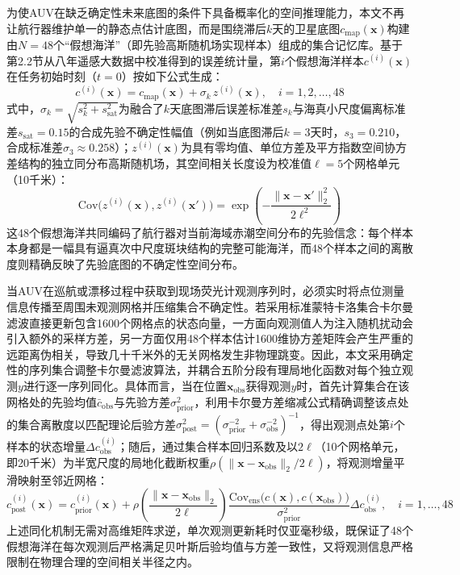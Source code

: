 为使AUV在缺乏确定性未来底图的条件下具备概率化的空间推理能力，本文不再让航行器维护单一的静态点估计底图，而是围绕滞后$k$天的卫星底图$c_{\text{map}}(\mathbf{x})$构建由$N=48$个“假想海洋”（即先验高斯随机场实现样本）组成的集合记忆库。基于第2.2节从八年遥感大数据中校准得到的误差统计量，第$i$个假想海洋样本$c^{(i)}(\mathbf{x})$在任务初始时刻（$t=0$）按如下公式生成：
\begin{equation}
  c^{(i)}(\mathbf{x}) = c_{\text{map}}(\mathbf{x}) + \sigma_k\, z^{(i)}(\mathbf{x}), \quad i = 1, 2, \dots, 48
  \label{eq:prior}
\end{equation}
式中，$\sigma_k = \sqrt{s_k^2 + s_{\text{sat}}^2}$为融合了$k$天底图滞后误差标准差$s_k$与海真小尺度偏离标准差$s_{\text{sat}}=0.15$的合成先验不确定性幅值（例如当底图滞后$k=3$天时，$s_3=0.210$，合成标准差$\sigma_3 \approx 0.258$）；$z^{(i)}(\mathbf{x})$为具有零均值、单位方差及平方指数空间协方差结构的独立同分布高斯随机场，其空间相关长度设为校准值$\ell = 5$个网格单元（10千米）：
\begin{equation}
  \text{Cov}\big(z^{(i)}(\mathbf{x}), z^{(i)}(\mathbf{x}')\big) = \exp\left(-\frac{\|\mathbf{x} - \mathbf{x}'\|_2^2}{2\ell^2}\right)
  \label{eq:cov}
\end{equation}
这48个假想海洋共同编码了航行器对当前海域赤潮空间分布的先验信念：每个样本本身都是一幅具有逼真次中尺度斑块结构的完整可能海洋，而48个样本之间的离散度则精确反映了先验底图的不确定性空间分布。

当AUV在巡航或漂移过程中获取到现场荧光计观测序列时，必须实时将点位测量信息传播至周围未观测网格并压缩集合不确定性。若采用标准蒙特卡洛集合卡尔曼滤波直接更新包含1600个网格点的状态向量，一方面向观测值人为注入随机扰动会引入额外的采样方差，另一方面仅用48个样本估计1600维协方差矩阵会产生严重的远距离伪相关，导致几十千米外的无关网格发生非物理跳变。因此，本文采用确定性的序列集合调整卡尔曼滤波算法\cite{anderson2001eakf}，并耦合五阶分段有理局地化函数\cite{gaspari1999correlation}对每个独立观测$y$进行逐一序列同化。具体而言，当在位置$\mathbf{x}_{\text{obs}}$获得观测$y$时，首先计算集合在该网格处的先验均值$\bar{c}_{\text{obs}}$与先验方差$\sigma_{\text{prior}}^2$，利用卡尔曼方差缩减公式精确调整该点处的集合离散度以匹配理论后验方差$\sigma_{\text{post}}^2 = (\sigma_{\text{prior}}^{-2} + \sigma_{\text{obs}}^{-2})^{-1}$，得出观测点处第$i$个样本的状态增量$\Delta c_{\text{obs}}^{(i)}$；随后，通过集合样本回归系数及以$2\ell$（10个网格单元，即20千米）为半宽尺度的局地化截断权重$\rho(\|\mathbf{x}-\mathbf{x}_{\text{obs}}\|_2 / 2\ell)$，将观测增量平滑映射至邻近网格：
\begin{equation}
  c_{\text{post}}^{(i)}(\mathbf{x}) = c_{\text{prior}}^{(i)}(\mathbf{x}) + \rho\left(\frac{\|\mathbf{x}-\mathbf{x}_{\text{obs}}\|_2}{2\ell}\right) \frac{\text{Cov}_{\text{ens}}\big(c(\mathbf{x}), c(\mathbf{x}_{\text{obs}})\big)}{\sigma_{\text{prior}}^2} \Delta c_{\text{obs}}^{(i)}, \quad i = 1, \dots, 48
  \label{eq:eakf}
\end{equation}
上述同化机制无需对高维矩阵求逆，单次观测更新耗时仅亚毫秒级，既保证了48个假想海洋在每次观测后严格满足贝叶斯后验均值与方差一致性，又将观测信息严格限制在物理合理的空间相关半径之内。

